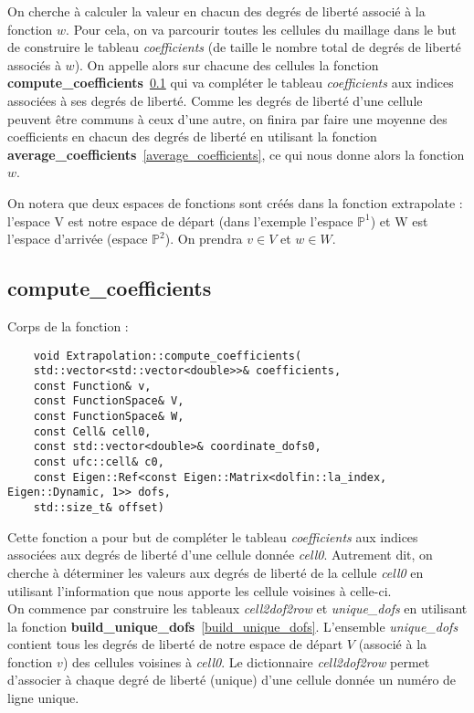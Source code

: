 On cherche à calculer la valeur en chacun des degrés de liberté associé à la fonction $w$. Pour cela, on va parcourir toutes les cellules du maillage dans le but de construire le tableau \textit{coefficients} (de taille le nombre total de degrés de liberté associés à $w$). On appelle alors sur chacune des cellules la fonction \textbf{compute\_coefficients}~\ref{compute_coefficients} qui va compléter le tableau \textit{coefficients} aux indices associées à ses degrés de liberté. Comme les degrés de liberté d'une cellule peuvent être communs à ceux d'une autre, on finira par faire une moyenne des coefficients en chacun des degrés de liberté en utilisant la fonction \textbf{average\_coefficients}~\ref{average_coefficients}, ce qui nous donne alors la fonction $w$. 

On notera que deux espaces de fonctions sont créés dans la fonction extrapolate : l'espace V est notre espace de départ (dans l'exemple l'espace $\mathbb{P}^1$) et W est l'espace d'arrivée (espace $\mathbb{P}^2$). On prendra $v\in V$ et $w\in W$.

\subsection{compute\_coefficients}
\label{compute_coefficients}

Corps de la fonction :

\begin{lstlisting}
	void Extrapolation::compute_coefficients(
	std::vector<std::vector<double>>& coefficients,
	const Function& v,
	const FunctionSpace& V,
	const FunctionSpace& W,
	const Cell& cell0,
	const std::vector<double>& coordinate_dofs0,
	const ufc::cell& c0,
	const Eigen::Ref<const Eigen::Matrix<dolfin::la_index, Eigen::Dynamic, 1>> dofs,
	std::size_t& offset)
\end{lstlisting}

Cette fonction a pour but de compléter le tableau \textit{coefficients} aux indices associées aux degrés de liberté d'une cellule donnée \textit{cell0}. Autrement dit, on cherche à déterminer les valeurs aux degrés de liberté de la cellule \textit{cell0} en utilisant l'information que nous apporte les cellule voisines à celle-ci.\\

On commence par construire les tableaux \textit{cell2dof2row} et \textit{unique\_dofs} en utilisant la fonction \textbf{build\_unique\_dofs}~\ref{build_unique_dofs}. L'ensemble \textit{unique\_dofs} contient tous les degrés de liberté de notre espace de départ $V$ (associé à la fonction $v$) des cellules voisines à \textit{cell0}. Le dictionnaire \textit{cell2dof2row} permet d'associer à chaque degré de liberté (unique) d'une cellule donnée un numéro de ligne unique. 

